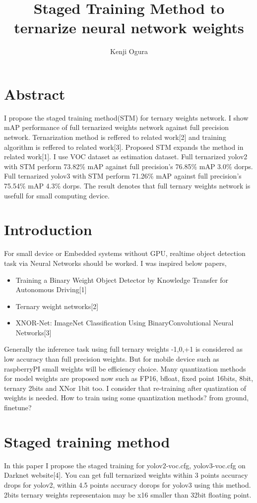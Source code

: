 \documentclass[twocolumn]{article}
\begin{document}
\title{Staged Training Method to ternarize neural network weights}
\author{Kenji Ogura}
\date{}
\maketitle

\section{Abstract}
I propose the staged training method(STM) for ternary weights network.
I show mAP performance of full ternarized weights network against full precision network.
Ternarization method is reffered to related work[2] and training algorithm is reffered to related work[3].
Proposed STM expands the method in related work[1].
I use VOC dataset as estimation dataset.
Full ternarized yolov2 with STM perform 73.82\% mAP against full precision's 76.85\% mAP  3.0\% dorps.
Full ternarized yolov3 with STM perform 71.26\% mAP against full precision's 75.54\% mAP 4.3\% dorps.
The result denotes that full ternary weights network is usefull for small computing device.

\section{Introduction}

For small device or Embedded systems without GPU, realtime object detection task via Neural Networks should be worked.
I was inspired below papers,
\begin{itemize}
\item
 Training a Binary Weight Object Detector by Knowledge Transfer for Autonomous Driving[1]
\item
 Ternary weight networks[2]
\item
 XNOR-Net: ImageNet Classification Using BinaryConvolutional Neural Networks[3]
\end{itemize}

Generally the inference task using full ternary weights -1,0,+1 is considered as low accuracy than full precision weights.
But for mobile device such as raspberryPI small weights will be efficiency choice.
Many quantization methods for model weights are proposed now such as FP16, bfloat, fixed point 16bits, 8bit, ternary 2bits and XNor 1bit too.
I consider that re-training after quatization of weights is needed.
How to train using some quantization methods? from ground, finetune?

\section{Staged training method}
In this paper I propose the staged training for yolov2-voc.cfg, yolov3-voc.cfg on Darknet website[4].
You can get full ternarized weights within 3 points accuracy drops for yolov2, within 4.5 points accuracy dorops for yolov3 using this method.
2bits ternary weights representaion may be x16 smaller than 32bit floating point.
\end{document}
